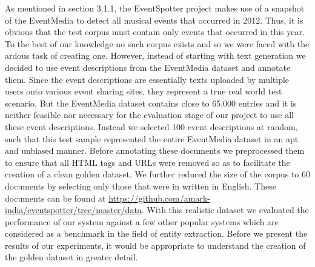 \documentclass[a4paper,11pt]{report}
\begin{document}
As mentioned in section 3.1.1, the EventSpotter project makes use of a snapshot of the EventMedia to detect all musical events that occurred in 2012. Thus, it is obvious that the test corpus must contain only events that occurred in this year. To the best of our knowledge no such corpus exists and so we were faced with the ardous task of creating one. However, instead of starting with text generation we decided to use event descriptions from the EventMedia dataset and annotate them. Since the event descriptions are essentially texts uploaded by multiple users onto various event sharing sites, they represent a true real world test scenario. But the EventMedia dataset contains close to 65,000 entries and it is neither feasible nor necessary for the evaluation stage of our project to use all these event descriptions. Instead we selected 100 event descriptions at random, such that this test sample represented the entire EventMedia dataset in an apt and unbiased manner. Before annotating these documents we preprocessed them to ensure that all HTML tags and URLs were removed so as to facilitate the creation of a clean golden dataset. We further reduced the size of the corpus to 60 documents by selecting only those that were in written in English. These documents can be found at \url{https://github.com/amark-india/eventspotter/tree/master/data}. With this realistic dataset we evaluated the performance of our system against a few other popular systems which are considered as a benchmark in the field of entity extraction. Before we present the results of our experiments, it would be appropriate to understand the creation of the golden dataset in greater detail.

\end{document}
